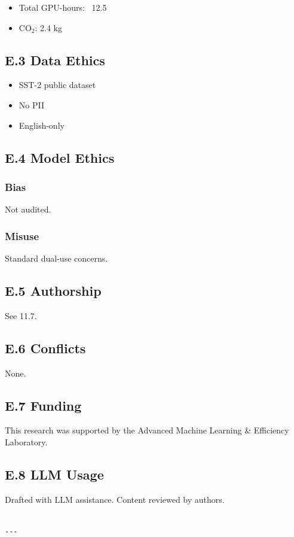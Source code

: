 \begin{itemize}
\item Total GPU-hours: ~12.5
\item CO$_2$: 2.4 kg

\end{itemize}
\subsection{E.3 Data Ethics}

\begin{itemize}
\item SST-2 public dataset
\item No PII
\item English-only

\end{itemize}
\subsection{E.4 Model Ethics}

\subsubsection{Bias}
Not audited.

\subsubsection{Misuse}
Standard dual-use concerns.

\subsection{E.5 Authorship}

See  11.7.

\subsection{E.6 Conflicts}

None.

\subsection{E.7 Funding}

This research was supported by the Advanced Machine Learning \& Efficiency Laboratory.

\subsection{E.8 LLM Usage}

Drafted with LLM assistance. Content reviewed by authors.
\begin{lstlisting}

---
\end{lstlisting}


